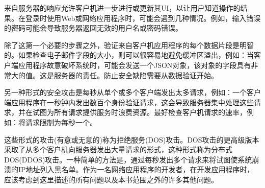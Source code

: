 来自服务器的响应允许客户机进一步进行或更新其UI，以让用户知道操作的结果。在登录时使用Web或网络应用程序时，可能会遇到几种情况。例如，输入错误的密码可能会导致服务器返回无效的用户名或密码错误。 \par
除了这第一个必要的步骤之外，验证来自客户机应用程序的每个数据片段是明智的。如果检查电子邮件字段的大小，则可以很容易地避免缓冲区溢出，例如：当客户端应用程序故意破坏系统时，可能会发送一个JSON对象，该对象的字段具有非常大的值。这是服务器的责任。防止安全缺陷需要从数据验证开始。 \par
另一种形式的安全攻击是每秒从单个或多个客户端发出太多请求，例如：一个客户端应用程序在一秒钟内发出数百个身份验证请求，这会导致服务器集中处理这些请求，并在试图为所有请求提供服务时浪费资源。最好检查客户机请求的速率，例如：将请求限制为每秒一个。 \par
这些形式的攻击(有意或无意的)称为拒绝服务(DOS)攻击。DOS攻击的更高级版本采取了从多个客户机向服务器发出大量请求的形式，这种形式称为分布式DOS(DDOS)攻击。一种简单的方法是，通过每秒发出多个请求来将试图使系统崩溃的IP地址列入黑名单。作为一名网络应用程序的开发者，在开发应用程序时，应该考虑到这里描述的所有问题以及本书范围之外的许多其他问题。 \par

